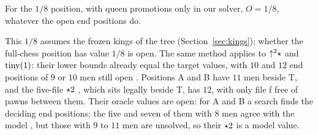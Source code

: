 \begin{proposition}\label{prop:eighth-real}
For the $1/8$ position, with queen promotions only in our solver, $O=1/8$, whatever the open end positions do.
\end{proposition}

This $1/8$ assumes the frozen kings of the tree (Section~\ref{sec:kings}); whether the full-chess position
has value $1/8$ is open. The same method applies to $\mathord{\uparrow^{2}}\star$ and $\operatorname{tiny}(1)$: their lower bounds already equal the
target values, with $10$ and $12$ end positions of $9$ or $10$ men still open . Positions A and B have $11$ men beside
T, and the five-file $\mathord{\star2}$ , which sits legally
beside T, has $12$, with only file f free of pawns between them. Their oracle values are open: for A and B a
search finds the deciding end positions; the five and seven of them with $8$ men agree with the model
, but those with $9$ to $11$ men are unsolved, so their $\mathord{\star2}$ is a model value.
